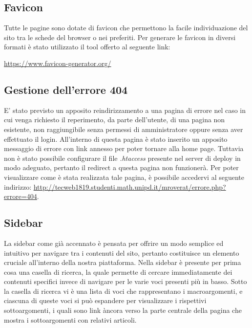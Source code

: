 \documentclass[12pt]{article}
\begin{document}
	\subsection{Favicon}
	Tutte le pagine sono dotate di favicon che permettono la facile individuazione del sito tra le schede del browser o nei preferiti. Per generare le favicon in diversi formati è stato utilizzato il tool offerto al seguente link:
	\begin{center} 
		\url{https://www.favicon-generator.org/} 
	\end{center}
	
	\subsection{Gestione dell'errore 404}
	E' stato previsto un apposito reindirizzamento a una pagina di errore nel caso in cui venga richiesto il reperimento, da parte dell'utente, di una pagina non esistente, non raggiungibile senza permessi di amministratore oppure senza aver effettuato il login.
	All'interno di questa pagina è stato inserito un apposito messaggio di errore con link annesso per poter tornare alla home page. Tuttavia non è stato possibile configurare il file \emph{.htaccess} presente nel server di deploy in modo adeguato, pertanto il redirect a questa pagina non funzionerà. Per poter visualizzare come è stata realizzata tale pagina, è possibile accedervi al seguente indirizzo: \url{http://tecweb1819.studenti.math.unipd.it/mroverat/errore.php?errore=404}.

	\subsection{Sidebar}
	La sidebar come già accennato è pensata per offrire un modo semplice ed intuitivo per navigare tra i contenuti del sito, pertanto costituisce un elemento cruciale all'interno della nostra piattaforma. Nella sidebar è presente per prima cosa una casella di ricerca, la quale permette di cercare immediatamente dei contenuti specifici invece di navigare per le varie voci presenti più in basso. Sotto la casella di ricerca vi è una lista di voci che rappresentano i macroargomenti, e ciascuna di queste voci si può espandere per visualizzare i rispettivi sottoargomenti, i quali sono link àncora verso la parte centrale della pagina che mostra i sottoargomenti con relativi articoli.
\end{document}
